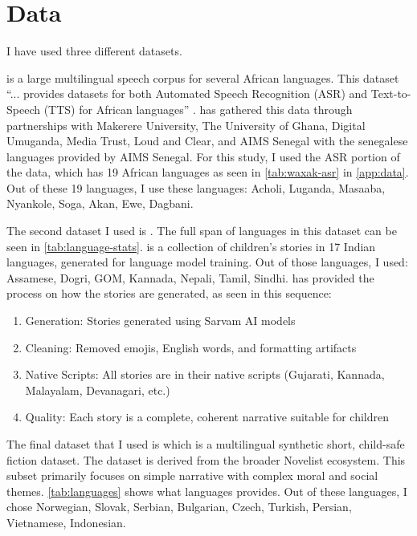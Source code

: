 \documentclass[11pt]{article} %
\begin{document}
    \section{Data}
    I have used three different datasets.

    \citet{waxal2026} is a large multilingual speech corpus for several African
    languages. This dataset ``... provides datasets for both Automated Speech Recognition
    (ASR) and Text-to-Speech (TTS) for African languages'' \citep{waxal2026}. \citet{waxal2026}
    has gathered this data through partnerships with Makerere University, The University
    of Ghana, Digital Umuganda, Media Trust, Loud and Clear, and AIMS Senegal with
    the senegalese languages provided by AIMS Senegal. For this study, I used the
    ASR portion of the data, which has 19 African languages as seen in
    \autoref{tab:waxak-asr} in \autoref{app:data}. Out of these 19 languages, I
    use these languages: Acholi, Luganda, Masaaba, Nyankole, Soga, Akan, Ewe,
    Dagbani.

    The second dataset I used is \citet{multilingual_tinystories_2026}. The full
    span of languages in this dataset can be seen in
    \autoref{tab:language-stats}. \citet{multilingual_tinystories_2026} is a
    collection of children's stories in 17 Indian languages, generated for language
    model training. Out of those languages, I used: Assamese, Dogri, GOM, Kannada,
    Nepali, Tamil, Sindhi. \citet{multilingual_tinystories_2026} has provided
    the process on how the stories are generated, as seen in this sequence:
    \begin{enumerate}
        \item Generation: Stories generated using Sarvam AI models

        \item Cleaning: Removed emojis, English words, and formatting artifacts

        \item Native Scripts: All stories are in their native scripts (Gujarati,
            Kannada, Malayalam, Devanagari, etc.)

        \item Quality: Each story is a complete, coherent narrative suitable for children
    \end{enumerate}

    The final dataset that I used is \citet{dxniz2026tinystoriesmultilingual}
    which is a multilingual synthetic short, child-safe fiction dataset. The
    dataset is derived from the broader Novelist ecosystem. This subset primarily
    focuses on simple narrative with complex moral and social themes.
    \autoref{tab:languages} shows what languages \citet{dxniz2026tinystoriesmultilingual}
    provides. Out of these languages, I chose Norwegian, Slovak, Serbian,
    Bulgarian, Czech, Turkish, Persian, Vietnamese, Indonesian.
\end{document}
